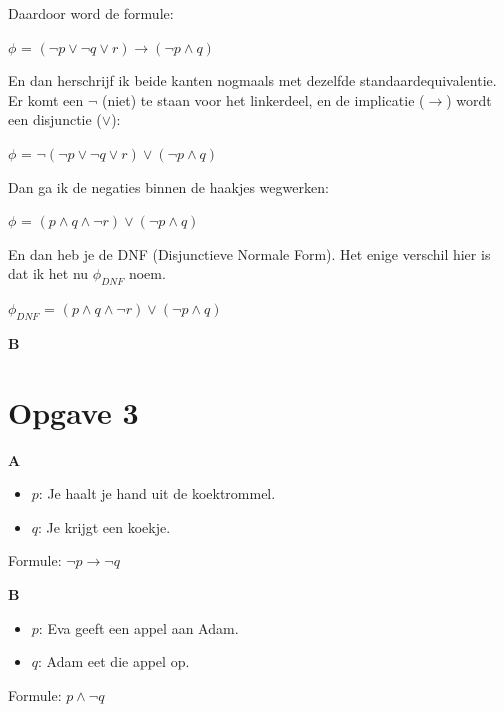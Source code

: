 \documentclass[11pt, a4paper]{article}
\begin{document}
Daardoor word de formule:
\begin{center}
	$\phi$ = $(\neg p \lor \neg q \lor r) \rightarrow (\neg p \land q)$ \\
\end{center}

En dan herschrijf ik beide kanten nogmaals met dezelfde standaardequivalentie. Er komt een $\neg$ (niet) te staan voor het linkerdeel, en de implicatie ($\rightarrow$) wordt een disjunctie ($\lor$):
\begin{center}
	$\phi$ = $\neg(\neg p \lor \neg q \lor r) \lor (\neg p \land q)$ \\
\end{center}

Dan ga ik de negaties binnen de haakjes wegwerken:
\begin{center}
	$\phi$ = $(p \land q \land \neg r) \lor (\neg p \land q)$ \\
\end{center}

En dan heb je de DNF (Disjunctieve Normale Form). Het enige verschil hier is dat ik het nu $\phi_{DNF}$ noem.
\begin{center}
	$\phi_{DNF}$ = $(p \land q \land \neg r) \lor (\neg p \land q)$ \\
\end{center}

\noindent\textbf{B}

\textemdash{}
\vspace{2cm}


\section{Opgave 3}
\textbf{A}

\begin{itemize}
	\item $p$: Je haalt je hand uit de koektrommel.
	\item $q$: Je krijgt een koekje.
\end{itemize}

Formule: $\neg p \rightarrow \neg q$

\noindent\textbf{B}

\begin{itemize}
	\item $p$: Eva geeft een appel aan Adam.
	\item $q$: Adam eet die appel op.
\end{itemize}

Formule: $p \land \neg q$
\end{document}

